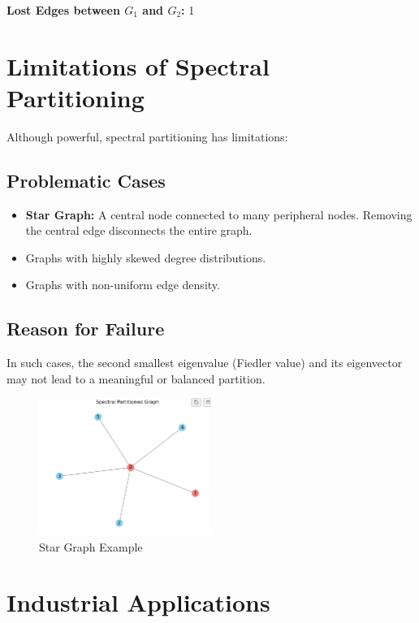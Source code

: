 \documentclass[hidelinks,12pt]{article}
\begin{document}
\noindent\textbf{Lost Edges between \(G_1\) and \(G_2\):} 1
\newpage
\section{Limitations of Spectral Partitioning}

Although powerful, spectral partitioning has limitations:

\subsection*{Problematic Cases}

\begin{itemize}
    \item \textbf{Star Graph:} A central node connected to many peripheral nodes. Removing the central edge disconnects the entire graph.
    \item Graphs with highly skewed degree distributions.
    \item Graphs with non-uniform edge density.
\end{itemize}

\subsection*{Reason for Failure}

In such cases, the second smallest eigenvalue (Fiedler value) and its eigenvector may not lead to a meaningful or balanced partition.

\begin{figure}[h!]
\centering
\includegraphics[width=0.5\textwidth]{figures/image09.png}
\caption{Star Graph Example}
\end{figure}
\newpage
\section*{Industrial Applications}
\end{document}
